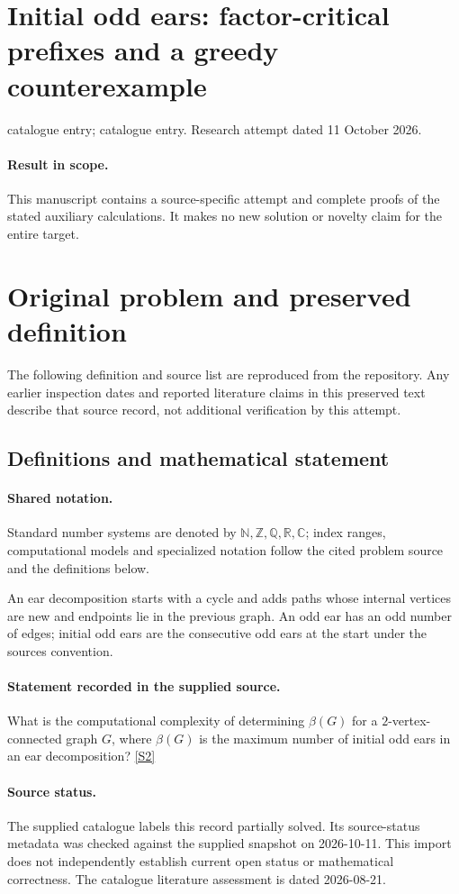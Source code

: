 \documentclass[11pt]{article}
\begin{document}
\section*{Initial odd ears: factor-critical prefixes and a greedy counterexample}
\noindent catalogue entry; catalogue entry. Research attempt dated 11 October 2026.
\paragraph{Result in scope.}This manuscript contains a source-specific attempt and complete proofs of the stated auxiliary calculations. It makes no new solution or novelty claim for the entire target.
\section{Original problem and preserved definition}
The following definition and source list are reproduced from the repository. Any earlier inspection dates and reported literature claims in this preserved text describe that source record, not additional verification by this attempt.
\subsection{Definitions and mathematical statement}

\paragraph{Shared notation.}Standard number systems are denoted by $\mathbb N,\mathbb Z,\mathbb Q,\mathbb R,\mathbb C$; index ranges, computational models and specialized notation follow the cited problem source and the definitions below.


An ear decomposition starts with a cycle and adds paths whose internal vertices are new and endpoints lie in the previous graph. An odd ear has an odd number of edges; initial odd ears are the consecutive odd ears at the start under the source\textquotesingle s convention.
\paragraph{Statement recorded in the supplied source.}
What is the computational complexity of determining $\beta(G)$ for a $2$-vertex-connected graph $G$, where $\beta(G)$ is the maximum number of initial odd ears in an ear decomposition? \href{https://doi.org/10.4171/owr/2014/51}{[S2]}
\paragraph{Source status.}
The supplied catalogue labels this record partially solved. Its source-status metadata was checked against the supplied snapshot on 2026-10-11. This import does not independently establish current open status or mathematical correctness. The catalogue literature assessment is dated 2026-08-21.
\end{document}
